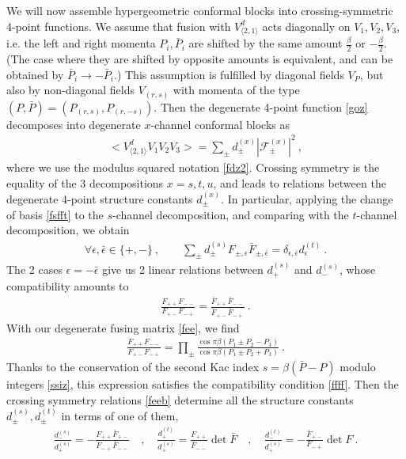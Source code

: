 \documentclass[12pt, a4paper]{article}
\begin{document}
We will now assemble hypergeometric conformal blocks into crossing-symmetric 4-point functions. We assume that fusion with $V^d_{\langle 2,1\rangle}$ acts diagonally on $V_1,V_2,V_3$, i.e. the left and right momenta $P_i,\bar P_i$ are shifted by the same amount $\frac{\beta}{2}$ or $-\frac{\beta}{2}$. (The case where they are shifted by opposite amounts is equivalent, and can be obtained by $\bar P_i\to -\bar P_i$.) This assumption is fulfilled by diagonal fields $V_P$, but also by non-diagonal fields $V_{(r,s)}$ with momenta of the type $(P,\bar P)= (P_{(r,s)},P_{(r,-s)})$.
Then the degenerate 4-point function \eqref{goz} decomposes into degenerate $x$-channel conformal blocks as 
\begin{align}
 \Big<V_{\langle 2,1\rangle}^dV_{1}V_{2}V_{3}\Big> 
 = \sum_\pm d^{(x)}_\pm \left|\mathcal{F}^{(x)}_\pm \right|^2  
 \ ,
\end{align}
where we use the modulus squared notation \eqref{fdz2}.
Crossing symmetry is the equality of the 3 decompositions $x=s,t,u$, and leads to relations between the degenerate 4-point structure constants $d^{(x)}_\pm$. In particular, applying the change of basis \eqref{fsfft} to the $s$-channel decomposition, and comparing with the $t$-channel decomposition, we obtain 
\begin{align}
 \forall \epsilon,\bar\epsilon \in \{+,-\}\ , \qquad \sum_\pm d_\pm^{(s)} F_{\pm,\epsilon}\bar F_{\pm, \bar\epsilon} = \delta_{\epsilon,\bar\epsilon} d_\epsilon^{(t)}\ . 
 \label{feeb}
\end{align}
The 2 cases $\epsilon = -\bar\epsilon$ give us 2 linear relations between $d^{(s)}_+$ and $d^{(s)}_-$, whose compatibility amounts to 
\begin{align}
 \frac{F_{++}F_{--}}{F_{+-}F_{-+}} = \frac{\bar F_{++}\bar F_{--}}{\bar F_{+-}\bar F_{-+}}\ .
 \label{ffff}
\end{align}
With our degenerate fusing matrix \eqref{fee}, we find 
\begin{align}
 \frac{F_{++}F_{--}}{F_{+-}F_{-+}} = \prod_\pm \frac{\cos \pi \beta(P_1\pm P_2-P_3)}{\cos \pi \beta(P_1\pm P_2+P_3)}\ . 
\end{align}
Thanks to the conservation of the second Kac index $s=\beta(\bar P-P)$ modulo integers \eqref{ssiz}, this expression satisfies the compatibility condition \eqref{ffff}. Then the crossing symmetry relations \eqref{feeb} determine all the structure constants $d^{(s)}_\pm,d^{(t)}_\pm$ in terms of one of them,
\begin{align}
 \frac{d^{(s)}_-}{d^{(s)}_+} = -\frac{F_{++}\bar F_{+-}}{F_{-+}\bar F_{--}}\quad , \quad 
 \frac{d^{(t)}_+}{d^{(s)}_+} = \frac{F_{++}}{\bar F_{--}} \det \bar F \quad , \quad 
 \frac{d^{(t)}_-}{d^{(s)}_+} = -\frac{\bar F_{+-}}{F_{-+}} \det F\ .
\end{align}
\end{document}
